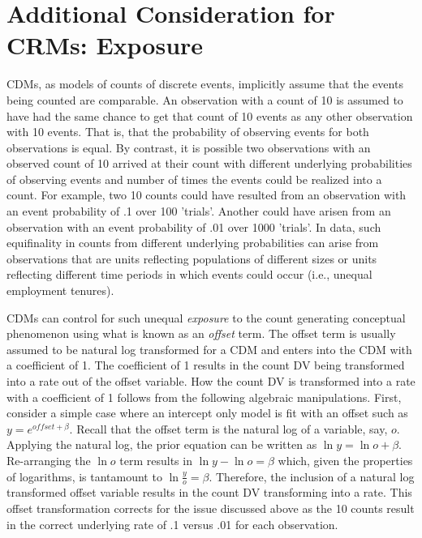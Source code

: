 \documentclass[ShortAfour,times,sageapa]{sagej}
\begin{document}
	
\section{Additional Consideration for CRMs: Exposure}
	
	CDMs, as models of counts of discrete events, implicitly assume that the events being counted are comparable.  
	An observation with a count of 10 is assumed to have had the same chance to get that count of 10 events as any other observation with 10 events.  
	That is, that the probability of observing events for both observations is equal.
	By contrast, it is possible two observations with an observed count of 10 arrived at their count with different underlying probabilities of observing events and number of times the events could be realized into a count.  
	For example, two 10 counts could have resulted from an observation with an event probability of .1 over 100 'trials'.  
	Another could have arisen from an observation with an event probability of .01 over 1000 'trials'.  
	In data, such equifinality in counts from different underlying probabilities can arise from observations that are units reflecting populations of different sizes or units reflecting different time periods in which events could occur (i.e., unequal employment tenures).
	
	CDMs can control for such unequal \emph{exposure} to the count generating conceptual phenomenon using what is known as an \emph{offset} term.  
	The offset term is usually assumed to be natural log transformed for a CDM and enters into the CDM with a coefficient of 1.
	The coefficient of 1 results in the count DV being transformed into a rate out of the offset variable.
	How the count DV is transformed into a rate with a coefficient of 1 follows from the following algebraic manipulations.
	First, consider a simple case where an intercept only model is fit with an offset such as $y = e^{offset + \beta}$.
	Recall that the offset term is the natural log of a variable, say, $o$.  
	Applying the natural log, the prior equation can be written as $\ln y = \ln o + \beta$.
	Re-arranging the $\ln o$ term results in $\ln y - \ln o = \beta$ which, given the properties of logarithms, is tantamount to $\ln \frac{y}{o} = \beta$.
	Therefore, the inclusion of a natural log transformed offset variable results in the count DV transforming into a rate.
	This offset transformation corrects for the issue discussed above as the 10 counts result in the correct underlying rate of .1 versus .01 for each observation.
	
\end{document}
